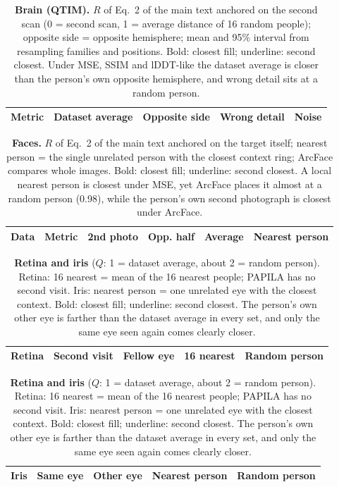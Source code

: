 \begin{table}[htbp]
\centering
\caption{\textbf{Brain (QTIM).}
$R$ of Eq.~2 of the main text anchored on the second scan (0 = second scan, 1 = average distance of 16 random people); opposite side = opposite hemisphere; mean and 95\% interval from resampling families and positions.
Bold: closest fill; underline: second closest.
Under \acs{MSE}, \acs{SSIM} and \acs{lDDT}-like the dataset average is closer than the person's own opposite hemisphere, and wrong detail sits at a random person.}
\label{tab:brain}
\scriptsize
\setlength{\tabcolsep}{2pt}
\begin{tabular}{@{}lcccc@{}}
\toprule
Metric & Dataset average & Opposite side & Wrong detail & Noise \\
\midrule

\end{tabular}
\end{table}

\begin{table}[htbp]
\centering
\caption{\textbf{Faces.}
$R$ of Eq.~2 of the main text anchored on the target itself; nearest person = the single unrelated person with the closest context ring; ArcFace compares whole images.
Bold: closest fill; underline: second closest.
A local nearest person is closest under \acs{MSE}, yet ArcFace places it almost at a random person (0.98), while the person's own second photograph is closest under ArcFace.}
\label{tab:face}
\scriptsize
\setlength{\tabcolsep}{2pt}
\begin{tabular}{@{}llcccc@{}}
\toprule
Data & Metric & 2nd photo & Opp. half & Average & Nearest person \\
\midrule

\end{tabular}
\end{table}

\begin{table}[htbp]
\centering
\caption{\textbf{Retina and iris} ($Q$: 1 = dataset average, about 2 = random person).
Retina: 16 nearest = mean of the 16 nearest people; PAPILA has no second visit.
Iris: nearest person = one unrelated eye with the closest context.
Bold: closest fill; underline: second closest.
The person's own other eye is farther than the dataset average in every set, and only the same eye seen again comes clearly closer.}
\label{tab:fundus}
\label{tab:iris}
\scriptsize
\setlength{\tabcolsep}{2pt}
\begin{tabular}{@{}lcccc@{}}
\toprule
Retina & Second visit & Fellow eye & 16 nearest & Random person \\
\midrule

\end{tabular}

\smallskip
\begin{tabular}{@{}lcccc@{}}
\toprule
Iris & Same eye & Other eye & Nearest person & Random person \\
\midrule

\end{tabular}
\end{table}
